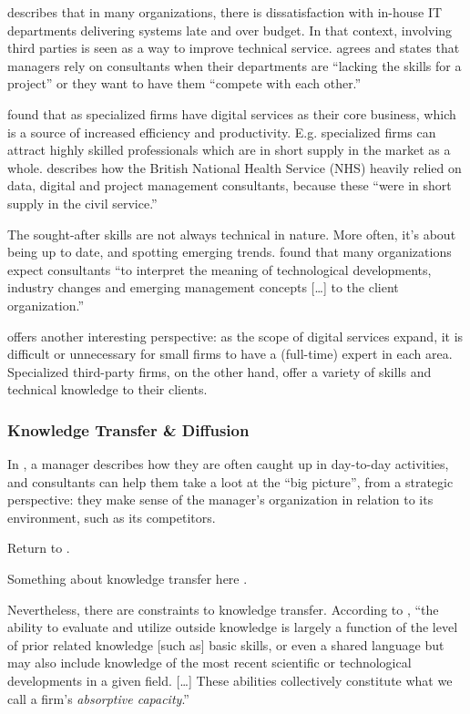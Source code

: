 \documentclass[12pt]{article}
\begin{document}
\citet[12]{lacity1994} describes that in many organizations, there is
dissatisfaction with in-house IT departments delivering systems late and
over budget. In that context, involving third parties is seen as a way
to improve technical service. \citet[233]{sturdy1998} agrees and states
that managers rely on consultants when their departments are ``lacking
the skills for a project'' or they want to have them ``compete with each
other.''

\citet[52]{aubert1996} found that as specialized firms have digital
services as their core business, which is a source of increased
efficiency and productivity. E.g. specialized firms can attract highly
skilled professionals which are in short supply in the market as a
whole. \citet[28]{mazzucato2023} describes how the British National
Health Service (NHS) heavily relied on data, digital and project
management consultants, because these ``were in short supply in the
civil service.''

The sought-after skills are not always technical in nature. More often,
it's about being up to date, and spotting emerging trends.
\citet[53]{werr2002} found that many organizations expect consultants
``to interpret the meaning of technological developments, industry
changes and emerging management concepts {[}\ldots{]} to the client
organization.''

\citet[452]{ketler1993} offers another interesting perspective: as the
scope of digital services expand, it is difficult or unnecessary for
small firms to have a (full-time) expert in each area. Specialized
third-party firms, on the other hand, offer a variety of skills and
technical knowledge to their clients.

\subsubsection{Knowledge Transfer \&
Diffusion}\label{knowledge-transfer-diffusion}

In \citet[53]{werr2002}, a manager describes how they are often caught
up in day-to-day activities, and consultants can help them take a loot
at the ``big picture'', from a strategic perspective: they make sense of
the manager's organization in relation to its environment, such as its
competitors.

Return to \citet{turner1982}.

Something about knowledge transfer here \citep{sturdy2009}.

Nevertheless, there are constraints to knowledge transfer. According to
\citet[128-129]{cohen1990}, ``the ability to evaluate and utilize
outside knowledge is largely a function of the level of prior related
knowledge {[}such as{]} basic skills, or even a shared language but may
also include knowledge of the most recent scientific or technological
developments in a given field. {[}\ldots{]} These abilities collectively
constitute what we call a firm's \emph{absorptive capacity}.''
\end{document}
